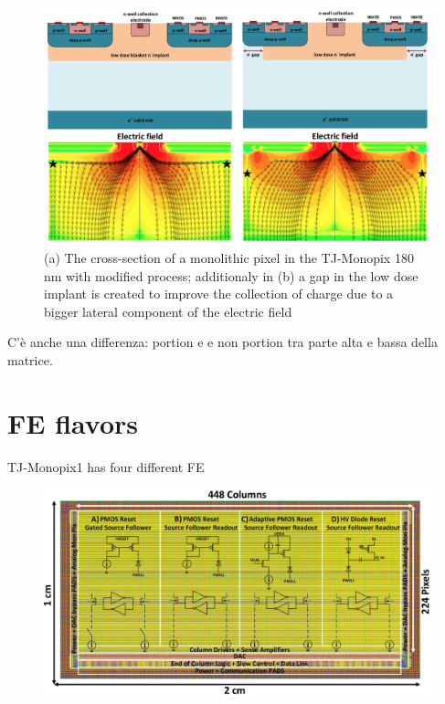     \begin{figure}[h!]
        \centering
        \includegraphics[width=.9\linewidth]{figures/Monopix1/Monopix1_section_scheme.png}
        \caption{(a) The cross-section of a monolithic pixel in the TJ-Monopix 180 nm with modified process; additionaly in (b) a gap in the low dose implant is created to improve the collection of charge due to a bigger lateral component of the electric field}
        \label{fig:Monopix1_section_scheme}
    \end{figure}

    C'è anche una differenza: portion e e non portion tra parte alta e bassa della matrice.\\


\section{FE flavors}
    TJ-Monopix1 has four different FE
    \begin{figure}[h!]
        \centering
        \includegraphics[width=.5\linewidth]{figures/Monopix1/Monopix1_flavors.png}
        \caption{}
        \label{fig:Monopix1_flavors}
    \end{figure}

